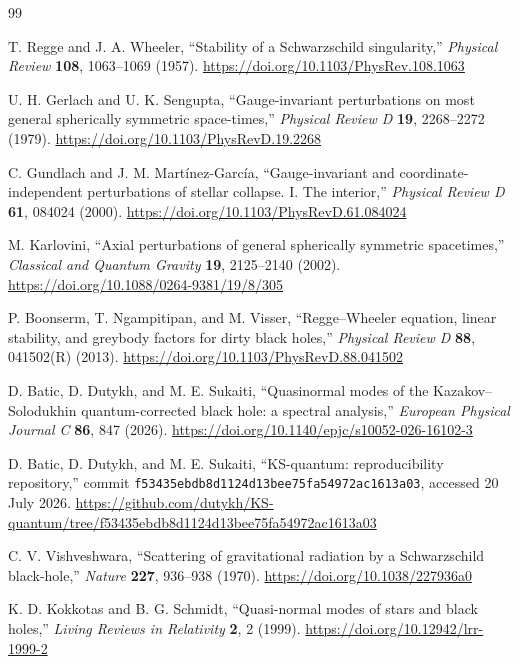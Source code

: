 \documentclass[12pt,a4paper]{article}
\begin{document}
\begin{thebibliography}{99}

T. Regge and J. A. Wheeler,
``Stability of a Schwarzschild singularity,''
\emph{Physical Review} \textbf{108}, 1063--1069 (1957).
\url{https://doi.org/10.1103/PhysRev.108.1063}

U. H. Gerlach and U. K. Sengupta,
``Gauge-invariant perturbations on most general spherically symmetric
space-times,''
\emph{Physical Review D} \textbf{19}, 2268--2272 (1979).
\url{https://doi.org/10.1103/PhysRevD.19.2268}

C. Gundlach and J. M. Mart\'inez-Garc\'ia,
``Gauge-invariant and coordinate-independent perturbations of stellar
collapse. I. The interior,''
\emph{Physical Review D} \textbf{61}, 084024 (2000).
\url{https://doi.org/10.1103/PhysRevD.61.084024}

M. Karlovini,
``Axial perturbations of general spherically symmetric spacetimes,''
\emph{Classical and Quantum Gravity} \textbf{19}, 2125--2140 (2002).
\url{https://doi.org/10.1088/0264-9381/19/8/305}

P. Boonserm, T. Ngampitipan, and M. Visser,
``Regge--Wheeler equation, linear stability, and greybody factors for dirty
black holes,''
\emph{Physical Review D} \textbf{88}, 041502(R) (2013).
\url{https://doi.org/10.1103/PhysRevD.88.041502}

D. Batic, D. Dutykh, and M. E. Sukaiti,
``Quasinormal modes of the Kazakov--Solodukhin quantum-corrected black hole:
a spectral analysis,''
\emph{European Physical Journal C} \textbf{86}, 847 (2026).
\url{https://doi.org/10.1140/epjc/s10052-026-16102-3}

D. Batic, D. Dutykh, and M. E. Sukaiti,
``KS-quantum: reproducibility repository,'' commit
\nolinkurl{f53435ebdb8d1124d13bee75fa54972ac1613a03}, accessed 20 July 2026.
\url{https://github.com/dutykh/KS-quantum/tree/f53435ebdb8d1124d13bee75fa54972ac1613a03}

C. V. Vishveshwara,
``Scattering of gravitational radiation by a Schwarzschild black-hole,''
\emph{Nature} \textbf{227}, 936--938 (1970).
\url{https://doi.org/10.1038/227936a0}

K. D. Kokkotas and B. G. Schmidt,
``Quasi-normal modes of stars and black holes,''
\emph{Living Reviews in Relativity} \textbf{2}, 2 (1999).
\url{https://doi.org/10.12942/lrr-1999-2}


\end{thebibliography}
\end{document}
